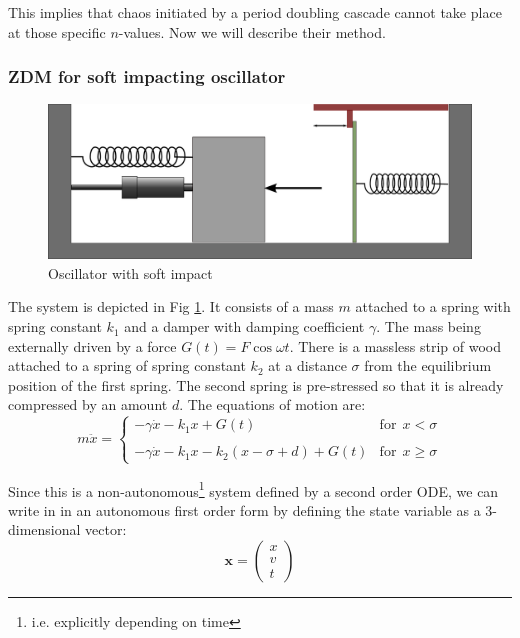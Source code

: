 \documentclass{book}
\renewcommand{\(}{\begin{columns}}
\renewcommand{\)}{\end{columns}}
\newcommand{\<}[1]{\begin{column}{#1}}
\renewcommand{\>}{\end{column}}
\newcommand{\mb}[1]{\mathbf{#1}}
\begin{document}
This implies that chaos initiated by a period doubling cascade cannot take 
place at those specific $n$-values.  Now we will describe their method.  

\subsubsection{ZDM for soft impacting oscillator}
\label{subsec-ZDM}

\begin{figure}[!htb]
\caption{Oscillator with soft impact}
\label{fig-soft-impact}
\begin{center}
\includegraphics[width=0.5\columnwidth]{soft-prest}
\end{center}
\end{figure}

The system is depicted in Fig \ref{fig-soft-impact}. It consists of a 
mass $m$ attached to a spring with spring constant $k_1$ and a damper with 
damping coefficient $\gamma$. The mass being externally driven by a force 
$G(t)=F\cos{\omega t}$.  There is a massless strip of wood attached to a 
spring of spring constant $k_2$ at a distance $\sigma$ from the equilibrium 
position of the first spring.  The second spring is pre-stressed so that it
 is already compressed by an amount $d$.  The equations of motion are:
\begin{equation}
m\ddot{x}=
\begin{cases} 
-\gamma \dot{x}-k_1x+G(t)&\mathrm{for}~~x<\sigma
\\ \\ 
-\gamma \dot{x}-k_1x-k_2(x-\sigma+d)+G(t)&\mathrm{for}~~x\geq\sigma 
\end{cases}
\end{equation}

Since this is a non-autonomous\footnote{i.e. explicitly depending on time} 
system defined by a second order ODE, we can write in in an autonomous first 
order form by 
defining the state variable as a 3-dimensional vector:
\begin{equation}
\label{def-statevec}
\mb{x}=
\begin{pmatrix}
x\\
v\\
t
\end{pmatrix}
\end{equation}
\end{document}
